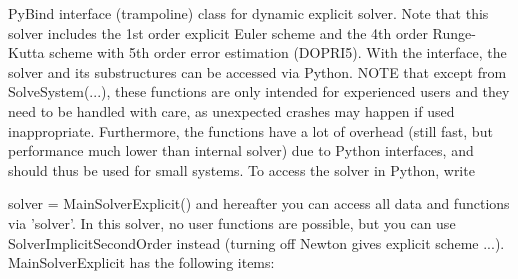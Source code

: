  \label{sec:MainSolverExplicit}
PyBind interface (trampoline) class for dynamic explicit solver. Note that this solver includes the 1st order explicit Euler scheme and the 4th order Runge-Kutta scheme with 5th order error estimation (DOPRI5). With the interface, the solver and its substructures can be accessed via Python. NOTE that except from SolveSystem(...), these functions are only intended for experienced users and they need to be handled with care, as unexpected crashes may happen if used inappropriate. Furthermore, the functions have a lot of overhead (still fast, but performance much lower than internal solver) due to Python interfaces, and should thus be used for small systems. To access the solver in Python, write \bi
 \item[] solver = MainSolverExplicit() 
\ei
 and hereafter you can access all data and functions via 'solver'.
 In this solver, no user functions are possible, but you can use SolverImplicitSecondOrder instead (turning off Newton gives explicit scheme ...).\\ 
%
MainSolverExplicit has the following items:
